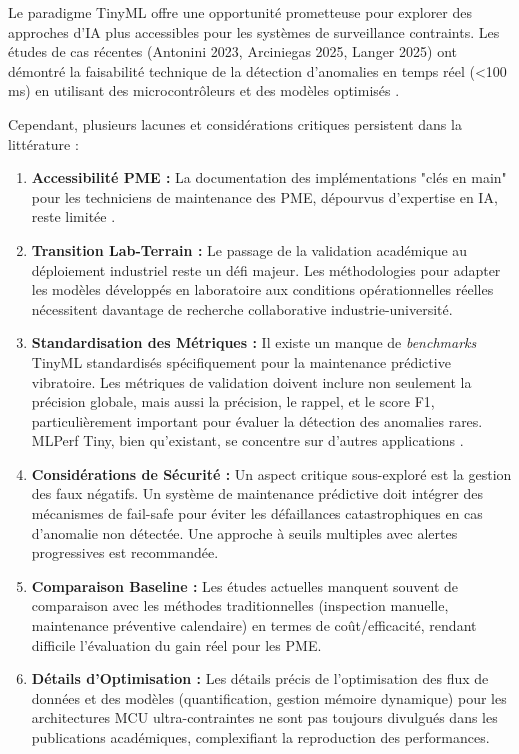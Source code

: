 Le paradigme TinyML offre une opportunité prometteuse pour explorer des approches d'IA plus accessibles pour les systèmes de surveillance contraints. Les études de cas récentes (Antonini 2023, Arciniegas 2025, Langer 2025) ont démontré la faisabilité technique de la détection d'anomalies en temps réel (<100\,ms) en utilisant des microcontrôleurs et des modèles optimisés \cite{antonini2023,arciniegas2025,langer2025}.

Cependant, plusieurs lacunes et considérations critiques persistent dans la littérature :

\begin{enumerate}
\item \textbf{Accessibilité PME :} La documentation des implémentations "clés en main" pour les techniciens de maintenance des PME, dépourvus d'expertise en IA, reste limitée \cite{oecd2021}.

\item \textbf{Transition Lab-Terrain :} Le passage de la validation académique au déploiement industriel reste un défi majeur. Les méthodologies pour adapter les modèles développés en laboratoire aux conditions opérationnelles réelles nécessitent davantage de recherche collaborative industrie-université.

\item \textbf{Standardisation des Métriques :} Il existe un manque de \textit{benchmarks} TinyML standardisés spécifiquement pour la maintenance prédictive vibratoire. Les métriques de validation doivent inclure non seulement la précision globale, mais aussi la précision, le rappel, et le score F1, particulièrement important pour évaluer la détection des anomalies rares. MLPerf Tiny, bien qu'existant, se concentre sur d'autres applications \cite{banbury2021}.

\item \textbf{Considérations de Sécurité :} Un aspect critique sous-exploré est la gestion des faux négatifs. Un système de maintenance prédictive doit intégrer des mécanismes de fail-safe pour éviter les défaillances catastrophiques en cas d'anomalie non détectée. Une approche à seuils multiples avec alertes progressives est recommandée.

\item \textbf{Comparaison Baseline :} Les études actuelles manquent souvent de comparaison avec les méthodes traditionnelles (inspection manuelle, maintenance préventive calendaire) en termes de coût/efficacité, rendant difficile l'évaluation du gain réel pour les PME.

\item \textbf{Détails d'Optimisation :} Les détails précis de l'optimisation des flux de données et des modèles (quantification, gestion mémoire dynamique) pour les architectures MCU ultra-contraintes ne sont pas toujours divulgués dans les publications académiques, complexifiant la reproduction des performances.
\end{enumerate}


